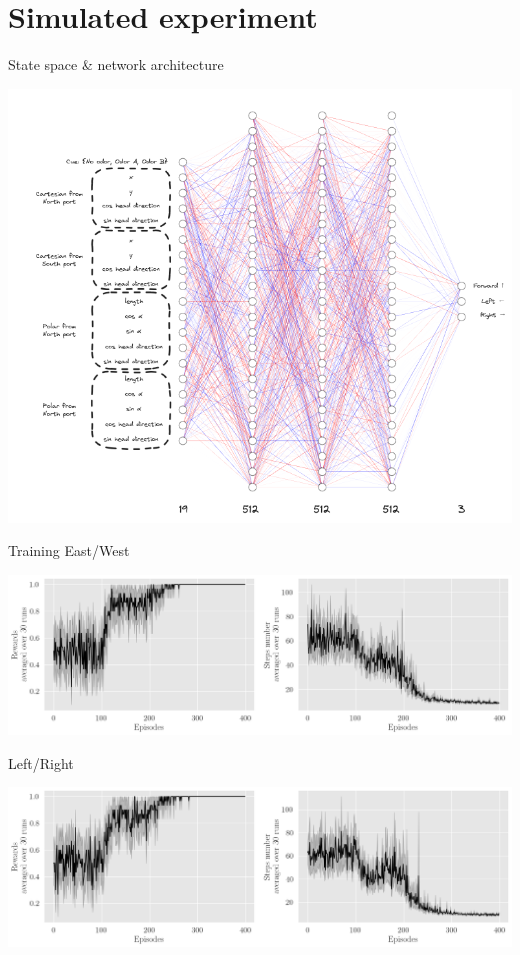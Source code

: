\documentclass[bigger]{beamer}
\begin{document}
\section{Simulated experiment}
\label{sec:org387501f}
\begin{frame}[label={sec:org1bfc512}]{State space \& network architecture}
\begin{center}
\includegraphics[height=0.97\textheight]{medias/state-space-nn.png}
\end{center}
\end{frame}
\begin{frame}[label={sec:org1562c1a}]{Training}
East/West
\begin{center}
\includegraphics[height=0.35\textheight]{medias/steps-and-rewards-EastWest.png}
\end{center}
Left/Right
\begin{center}
\includegraphics[height=0.35\textheight]{medias/steps-and-rewards-LeftRight.png}
\end{center}
\end{frame}
\end{document}
